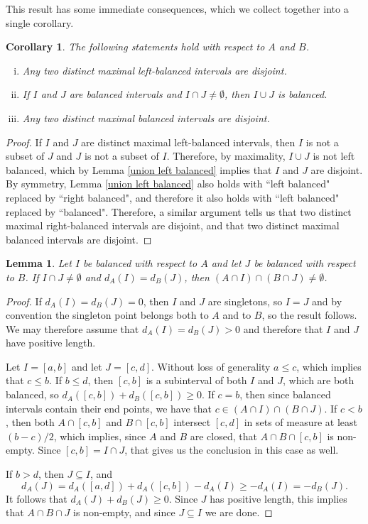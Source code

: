 \documentclass[11pt,reqno]{amsart}
\newtheorem{lemma}[theorem]{Lemma}
\newtheorem{corollary}[theorem]{Corollary}
\theoremstyle{definition}
\def\subset{\subseteq}
\begin{document}
This result has some immediate consequences, which we collect together into a single corollary.

\begin{corollary} \label{balanced intervals} The following statements hold with respect to $A$ and $B$.
\begin{enumerate}[(i)]
\item Any two distinct maximal left-balanced intervals are disjoint.
\item If $I$ and $J$ are balanced intervals and $I\cap J\ne\emptyset$, then $I\cup J$ is balanced.
\item Any two distinct maximal balanced intervals are disjoint.
\end{enumerate}
\end{corollary}

\begin{proof} If $I$ and $J$ are distinct maximal left-balanced intervals, then $I$ is not a subset of $J$ and $J$ is not a subset of $I$. Therefore, by maximality, $I\cup J$ is not left balanced, which by Lemma \ref{union left balanced} implies that $I$ and $J$ are disjoint. By symmetry, Lemma \ref{union left balanced} also holds with ``left balanced" replaced by ``right balanced", and therefore it also holds with ``left balanced" replaced by ``balanced". Therefore,   a similar argument tells us that two distinct maximal right-balanced intervals are disjoint, and that two distinct maximal balanced intervals are disjoint. 
\end{proof}

\begin{lemma} \label{intersect balanced}
Let $I$ be balanced with respect to $A$ and let $J$ be balanced with respect to $B$. If $I\cap J\ne\emptyset$ and $d_A(I)=d_B(J)$, then $(A\cap I)\cap (B\cap J)\ne\emptyset$.
\end{lemma}

\begin{proof}
If $d_A(I)=d_B(J)=0$, then $I$ and $J$ are singletons, so $I=J$ and by convention the singleton point belongs both to $A$ and to $B$, so the result follows. We may therefore assume that $d_A(I)=d_B(J)>0$ and therefore that $I$ and $J$ have positive length.

Let $I=[a,b]$ and let $J=[c,d]$. Without loss of generality $a\leq c$, which implies that $c\leq b$. If $b\leq d$, then $[c,b]$ is a subinterval of both $I$ and $J$, which are both balanced, so $d_A([c,b])+d_B([c,b])\geq 0$. If $c=b$, then since balanced intervals contain their end points, we have that $c\in(A\cap I)\cap (B\cap J)$. If $c<b$, then both $A\cap[c,b]$ and $B\cap[c,b]$ intersect $[c,d]$ in sets of measure at least $(b-c)/2$, which implies, since $A$ and $B$ are closed, that $A\cap B\cap[c,b]$ is non-empty. Since $[c,b]=I\cap J$, that gives us the conclusion in this case as well.

If $b>d$, then $J\subset I$, and 
\[d_A(J)=d_A([a,d])+d_A([c,b])-d_A(I)\geq -d_A(I)=-d_B(J).\]
It follows that $d_A(J)+d_B(J)\geq 0$. Since $J$ has positive length, this implies that $A\cap B\cap J$ is non-empty, and since $J\subset I$ we are done.
\end{proof}
\end{document}
